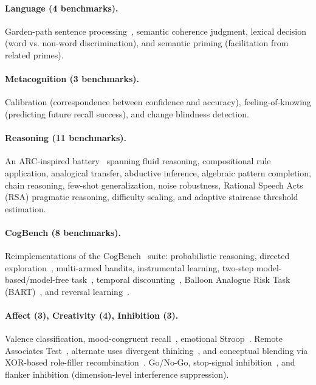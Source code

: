 \documentclass[11pt,letterpaper]{article}
\begin{document}
\paragraph{Language (4 benchmarks).} Garden-path sentence processing~\citep{ferreira2002good}, semantic coherence judgment, lexical decision (word vs. non-word discrimination), and semantic priming (facilitation from related primes).

\paragraph{Metacognition (3 benchmarks).} Calibration (correspondence between confidence and accuracy), feeling-of-knowing (predicting future recall success), and change blindness detection.

\paragraph{Reasoning (11 benchmarks).} An ARC-inspired battery~\citep{chollet2019measure} spanning fluid reasoning, compositional rule application, analogical transfer, abductive inference, algebraic pattern completion, chain reasoning, few-shot generalization, noise robustness, Rational Speech Acts (RSA) pragmatic reasoning, difficulty scaling, and adaptive staircase threshold estimation.

\paragraph{CogBench (8 benchmarks).} Reimplementations of the CogBench~\citep{codaforno2024cogbench} suite: probabilistic reasoning, directed exploration~\citep{wilson2014humans}, multi-armed bandits, instrumental learning, two-step model-based/model-free task~\citep{daw2011model}, temporal discounting~\citep{kirby1999heroin}, Balloon Analogue Risk Task (BART)~\citep{lejuez2002evaluation}, and reversal learning~\citep{cools2002reversal}.

\paragraph{Affect (3), Creativity (4), Inhibition (3).} Valence classification, mood-congruent recall~\citep{bower1981mood}, emotional Stroop~\citep{williams1996emotional}. Remote Associates Test~\citep{mednick1962associative}, alternate uses divergent thinking~\citep{guilford1967nature}, and conceptual blending via XOR-based role-filler recombination~\citep{fauconnier2002way}. Go/No-Go, stop-signal inhibition~\citep{logan1984ability}, and flanker inhibition (dimension-level interference suppression).
\end{document}
